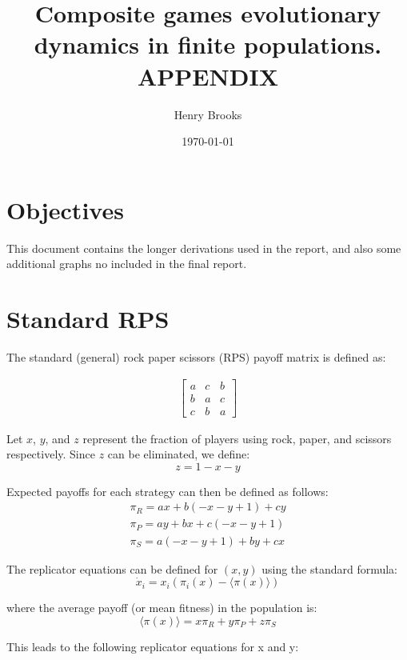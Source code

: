 \documentclass{article}
\title{Composite games evolutionary dynamics in finite populations. APPENDIX}
\author{Henry Brooks}
\date{\today}
\begin{document}
\maketitle



\section{Objectives}
This document contains the longer derivations used in the report, and also some additional graphs
no included in the final report.




\section{Standard RPS}


The standard (general) rock paper scissors (RPS) payoff matrix is defined as:

\begin{align}
\begin{bmatrix}
    a & c & b\\
    b & a & c\\
    c & b & a
\end{bmatrix}
\end{align}

Let \( x \), \( y \), and \( z \) represent the fraction of players using rock, paper, and scissors respectively. Since \( z \) can be eliminated, we define:
\[
z = 1 - x - y
\]


Expected payoffs for each strategy can then be defined as follows:
\begin{align}
   \pi_R = a x + b \left(- x - y + 1\right) + c y \\
   \pi_P = a y + b x + c \left(- x - y + 1\right) \\
   \pi_S = a \left(- x - y + 1\right) + b y + c x
\end{align}


The replicator equations can be defined for $(x, y)$ using the standard formula:
\begin{equation}
    \dot x_i = x_i(\pi_i(x) - \langle \pi(x) \rangle)
\end{equation}

where the average payoff (or mean fitness) in the population is:
\[
\langle \pi(x) \rangle = x \pi_R + y \pi_P + z \pi_S
\]

This leads to the following replicator equations for x and y:
\end{document}
